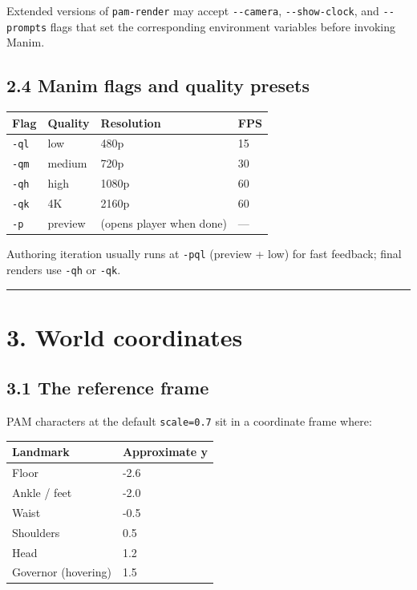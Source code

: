 \documentclass[
  11pt,
]{book}
\begin{document}
Extended versions of \texttt{pam-render} may accept \texttt{-\/-camera},
\texttt{-\/-show-clock}, and \texttt{-\/-prompts} flags that set the
corresponding environment variables before invoking Manim.

\subsection{2.4 Manim flags and quality
presets}\label{manim-flags-and-quality-presets}

\begin{longtable}[]{@{}llll@{}}
\toprule\noalign{}
Flag & Quality & Resolution & FPS \\
\midrule\noalign{}
\endhead
\bottomrule\noalign{}
\endlastfoot
\texttt{-ql} & low & 480p & 15 \\
\texttt{-qm} & medium & 720p & 30 \\
\texttt{-qh} & high & 1080p & 60 \\
\texttt{-qk} & 4K & 2160p & 60 \\
\texttt{-p} & preview & (opens player when done) & --- \\
\end{longtable}

Authoring iteration usually runs at \texttt{-pql} (preview + low) for
fast feedback; final renders use \texttt{-qh} or \texttt{-qk}.

\begin{center}\rule{0.5\linewidth}{0.5pt}\end{center}

\section{3. World coordinates}\label{world-coordinates}

\subsection{3.1 The reference frame}\label{the-reference-frame}

PAM characters at the default \texttt{scale=0.7} sit in a coordinate
frame where:

\begin{longtable}[]{@{}ll@{}}
\toprule\noalign{}
Landmark & Approximate y \\
\midrule\noalign{}
\endhead
\bottomrule\noalign{}
\endlastfoot
Floor & -2.6 \\
Ankle / feet & -2.0 \\
Waist & -0.5 \\
Shoulders & 0.5 \\
Head & 1.2 \\
Governor (hovering) & 1.5 \\
\end{longtable}
\end{document}

